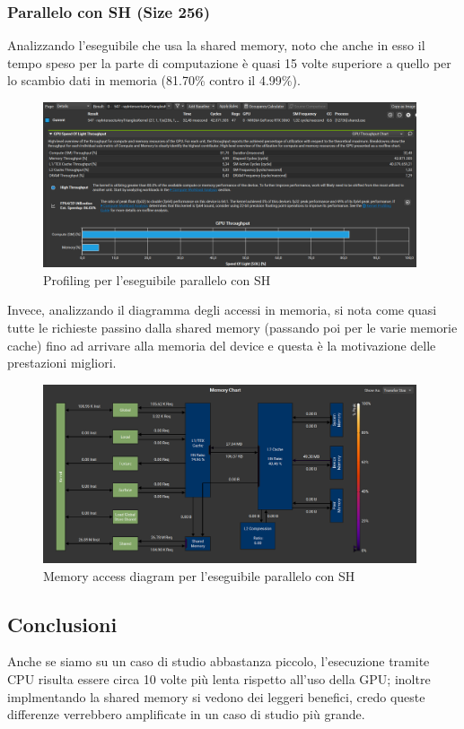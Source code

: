 \documentclass[a4paper]{article}
\begin{document}
\subsubsection{Parallelo con SH (Size 256)}

Analizzando l'eseguibile che usa la shared memory, noto che anche in esso il tempo speso per la parte di computazione è quasi 15 volte superiore a quello per lo scambio dati in memoria (81.70\% contro il 4.99\%).

\begin{figure}[ht]
    \centering
    \includegraphics[width=0.98\textwidth]{images/shared.png}
    \caption{Profiling per l'eseguibile parallelo con SH}
\end{figure}

Invece, analizzando il diagramma degli accessi in memoria, si nota come quasi tutte le richieste passino dalla shared memory (passando poi per le varie memorie cache) fino ad arrivare alla memoria del device e questa è la motivazione delle prestazioni migliori.

\begin{figure}[ht]
    \centering
    \includegraphics[width=0.98\textwidth]{images/shared_chart.png}
    \caption{Memory access diagram per l'eseguibile parallelo con SH}
\end{figure}

\subsection{Conclusioni}

Anche se siamo su un caso di studio abbastanza piccolo, l'esecuzione tramite CPU risulta essere circa 10 volte più lenta rispetto all'uso della GPU; inoltre implmentando la shared memory si vedono dei leggeri benefici, credo queste differenze verrebbero amplificate in un caso di studio più grande.
\end{document}

